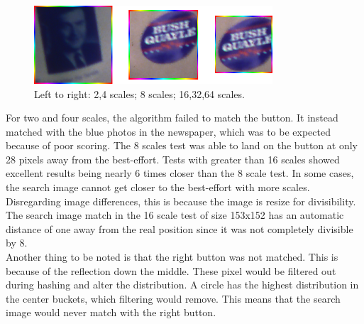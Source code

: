 \documentclass[10pt, journal]{vgtc}                %
\newcommand\tab[1][1cm]{\hspace*{#1}}
\begin{document}
\begin{flushleft}
	\begin{figure}[h!]
		\centering
		\includegraphics[width=3.5in]{cropped.png}
		\caption{Left to right: 2,4 scales; 8 scales; 16,32,64 scales.}
	\end{figure}
	\tab For two and four scales, the algorithm failed to match the button. It instead matched with the blue photos in the newspaper, which was to be expected because of poor scoring. The 8 scales test was able to land on the button at only 28 pixels away from the best-effort. Tests with greater than 16 scales showed excellent results being nearly 6 times closer than the 8 scale test. In some cases, the search image cannot get closer to the best-effort with more scales. Disregarding image differences, this is because the image is resize for divisibility. The search image match in the 16 scale test of size 153x152 has an automatic distance of one away from the real position since it was not completely divisible by 8.\\\smallskip
\tab Another thing to be noted is that the right button was not matched. This is because of the reflection down the middle. These pixel would be filtered out during hashing and alter the distribution. A circle has the highest distribution in the center buckets, which filtering would remove. This means that the search image would never match with the right button.
	
\end{flushleft}
\end{document}
